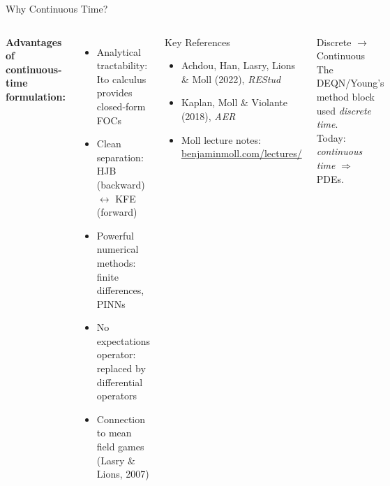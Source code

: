 \documentclass[aspectratio=169,11pt]{beamer}
\newcommand{\emphc}[1]{\textcolor{harvardcrimson}{#1}}
\begin{document}
\begin{frame}{Why Continuous Time?}
\begin{columns}[T]
\textbf{Advantages of continuous-time formulation:}
\begin{itemize}\itemsep2pt
    \item \emphc{Analytical tractability}: Ito calculus provides closed-form FOCs
    \item \emphc{Clean separation}: HJB (backward) $\leftrightarrow$ KFE (forward)
    \item \emphc{Powerful numerical methods}: finite differences, PINNs
    \item \emphc{No expectations operator}: replaced by differential operators
    \item \emphc{Connection to mean field games} (Lasry \& Lions, 2007)
\end{itemize}

\begin{block}{Key References}
\small
\begin{itemize}\itemsep2pt
    \item Achdou, Han, Lasry, Lions \& Moll (2022), \emph{REStud}
    \item Kaplan, Moll \& Violante (2018), \emph{AER}
    \item Moll lecture notes:\\ \url{benjaminmoll.com/lectures/}
\end{itemize}
\end{block}

\vspace{0.3em}
\begin{alertblock}{\small Discrete $\to$ Continuous}
\small
The DEQN/Young's method block used \emph{discrete time}.\\
Today: \emph{continuous time} $\Rightarrow$ PDEs.
\end{alertblock}
\end{columns}
\end{frame}
\end{document}
